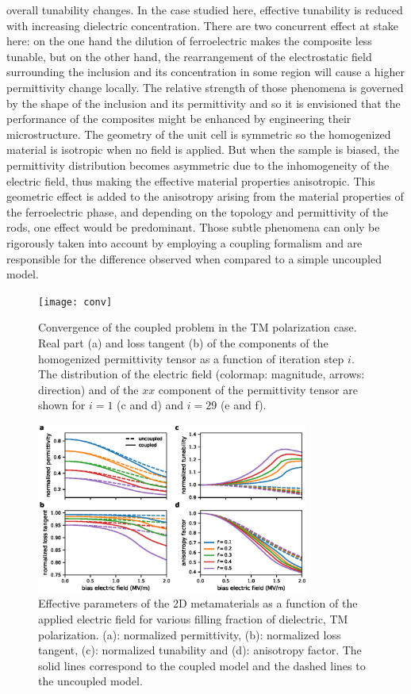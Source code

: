 \documentclass[%
 reprint,
 amsmath,amssymb,
 aps,
]{revtex4-2}
\begin{document}
 overall tunability changes. In the case studied here, effective tunability is reduced with
 increasing dielectric concentration. There are two concurrent effect at stake here: on the one hand
 the dilution of ferroelectric makes the composite less tunable, but on the other hand,
 the rearrangement of the electrostatic field surrounding the inclusion and its
 concentration in some region will cause a higher permittivity change locally.
 The relative strength of those phenomena is governed by the shape of the inclusion and its permittivity
 and so it is envisioned that the performance of the composites might be enhanced by engineering
 their microstructure.
 The geometry of the unit cell is symmetric so the homogenized material is
  isotropic when no field is applied.
 But when the sample is biased, the permittivity distribution becomes asymmetric due
 to the inhomogeneity of the electric field, thus making the effective material properties anisotropic.
This geometric effect is added to the anisotropy arising from the material properties of the ferroelectric
phase, and depending on the topology and permittivity of the rods, one effect would be predominant.
Those subtle phenomena can only be rigorously taken into account by employing a coupling formalism
and are responsible for the difference observed when compared to a simple uncoupled model.\\

\begin{figure}[!t]
\centering
\texttt{[image: conv]}
\caption{Convergence of the coupled problem in the TM polarization case.
Real part (a) and loss tangent (b) of the components of the homogenized
 permittivity tensor as a function of iteration step $i$. The distribution of
 the electric field (colormap: magnitude, arrows: direction) and of the
 $xx$ component of the permittivity tensor are shown for $i=1$
  (c and d) and $i=29$ (e and f).
 }
\label{conv2D}
\end{figure}

\begin{figure}[!t]
\centering
\includegraphics[width=0.8\textwidth]{effpar_per}
\caption{Effective parameters of the 2D metamaterials as a function of the
 applied electric field for various filling fraction of dielectric, TM polarization.
 (a): normalized permittivity, (b): normalized loss tangent, (c): normalized tunability and
 (d): anisotropy factor. The solid lines correspond to the coupled model and
 the dashed lines to the uncoupled model.}
\label{eff_par_2D_TM}
\end{figure}
\end{document}
